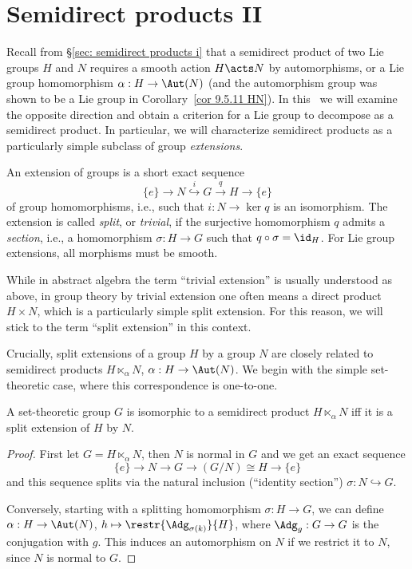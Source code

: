 \section{Semidirect products II}\label{sec: semidirect prod}


Recall from \S\ref{sec: semidirect products i} that a semidirect product of two Lie groups $H$ and $N$ requires a smooth action $H\acts N$ by automorphisms, or a Lie group homomorphism $\alpha:H\to \Aut(N)$ (and the automorphism group was shown to be a Lie group in Corollary~\ref{cor 9.5.11 HN}). In this \sect\ we will examine the opposite direction and obtain a criterion for a Lie group to decompose as a semidirect product. In particular, we will characterize semidirect products as a particularly simple subclass of group \emph{extensions}.

\begin{defn}
    An extension of groups is a short exact sequence
    \[\{e\}\to N\overset{i}{\hookrightarrow} G\overset{q}{\to} H\to \{e\}\]
    of group homomorphisms, i.e., such that $i:N\to \ker q$ is an isomorphism. The extension is called \emph{split}, or \emph{trivial}, if the surjective homomorphism $q$ admits a \emph{section}, i.e., a homomorphism $\sigma:H\to G$ such that $q\circ \sigma=\id_H$. For Lie group extensions, all morphisms must be smooth.
\end{defn}

\begin{rem}
    While in abstract algebra the term ``trivial extension'' is usually understood as above, in group theory by trivial extension one often means a direct product $H\times N$, which is a particularly simple split extension. For this reason, we will stick to the term ``split extension'' in this context.
\end{rem}

Crucially, split extensions of a group $H$ by a group $N$ are closely related to semidirect products $H\ltimes_\alpha N$, $\alpha:H\to \Aut(N)$. We begin with the simple set-theoretic case, where this correspondence is one-to-one.

\begin{prop}
    A set-theoretic group $G$ is isomorphic to a semidirect product $H\ltimes_\alpha N$ iff it is a split extension of $H$ by $N$.
\end{prop}
\begin{proof}
    First let $G=H\ltimes_\alpha N$, then $N$ is normal in $G$ and we get an exact sequence 
    \[\{e\}\to N\to G\to (G\slash N)\cong H\to \{e\}\]
    and this sequence splits via the natural inclusion (``identity section'') $\sigma:N\hookrightarrow G$.

    Conversely, starting with a splitting homomorphism $\sigma:H\to G$, we can define $\alpha:H\to \Aut(N)$, $h\mapsto \restr{\Adg_{\sigma(k)}}{H}$, where $\Adg_g:G\to G$ is the conjugation with $g$. This induces an automorphism on $N$ if we restrict it to $N$, since $N$ is normal to $G$.
\end{proof}

